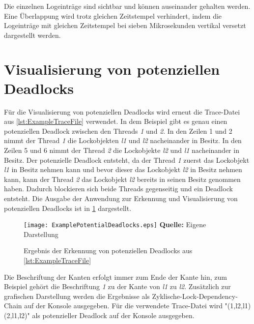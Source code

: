 Die einzelnen Logeinträge sind sichtbar und können auseinander gehalten werden.
Eine Überlappung wird trotz gleichen Zeitstempel verhindert, indem die
Logeinträge mit gleichen Zeitstempel bei sieben Mikrosekunden vertikal versetzt
dargestellt werden.

\section{Visualisierung von potenziellen Deadlocks}
\label{section:DeadlockVisualization}
Für die Visualisierung von potenziellen Deadlocks wird erneut die Trace-Datei
aus \cref{lst:ExampleTraceFile} verwendet. In dem Beispiel gibt es genau einen
potenziellen Deadlock zwischen den Threads \emph{1} und \emph{2}. In den Zeilen
1 und 2 nimmt der Thread \emph{1} die Lockobjekten \emph{l1} und \emph{l2}
nacheinander in Besitz. In den Zeilen 5 und 6 nimmt der Thread \emph{2} die
Lockobjekte \emph{l2} und \emph{l1} nacheinander in Besitz. Der potenzielle
Deadlock entsteht, da der Thread \emph{1} zuerst das Lockobjekt \emph{l1} in
Besitz nehmen kann und bevor dieser das Lockobjekt \emph{l2} in Besitz nehmen
kann, kann der Thread \emph{2} das Lockobjekt \emph{l2} bereits in seinen Besitz
genommen haben. Dadurch blockieren sich beide Threads gegenseitig und ein
Deadlock entsteht. Die Ausgabe der Anwendung zur Erkennung und Visualisierung
von potenziellen Deadlocks ist in \cref{fig:DeadlockVisualization} dargestellt.
\begin{figure}[ht]
  \texttt{[image: ExamplePotentialDeadlocks.eps]}
  \footnotesize\sffamily\textbf{Quelle:} Eigene Darstellung
  \caption{Ergebnis der Erkennung von potenziellen Deadlocks aus \cref{lst:ExampleTraceFile}}
  \label{fig:DeadlockVisualization}
\end{figure}
Die Beschriftung der Kanten erfolgt immer zum Ende der Kante hin, zum Beispiel
gehört die Beschriftung \emph{1} zu der Kante von \emph{l1} zu \emph{l2}.
Zusätzlich zur grafischen Darstellung werden die Ergebnisse als
Zyklische-Lock-Dependency-Chain auf der Konsole ausgegeben. Für die verwendete
Trace-Datei wird "(1,l2,{l1}) (2,l1,{l2})" als potenzieller Deadlock auf der
Konsole ausgegeben.